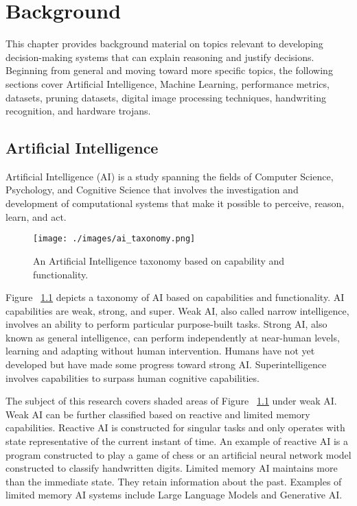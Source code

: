 \chapter{Background} \label{ch:background}

This chapter provides background material on topics relevant to developing
decision-making systems that can explain reasoning and justify decisions.
Beginning from general and moving toward more specific topics, the following
sections cover Artificial Intelligence, Machine Learning, performance metrics,
datasets, pruning datasets, digital image processing techniques, handwriting
recognition, and hardware trojans.

\section{Artificial Intelligence}\label{sec:ai}

Artificial Intelligence (AI) is a study spanning the fields of Computer Science,
Psychology, and Cognitive Science that involves the investigation and
development of computational systems that make it possible to perceive, reason,
learn, and act\cite{winston1992artificial, simon1995artificial,
russell2016artificial, tzimas2021legal}.

\begin{figure}[h]
    \centering
    \texttt{[image: ./images/ai\_taxonomy.png]}
    \caption{An Artificial Intelligence taxonomy based on capability and functionality.}
    \label{fig:ai_taxonomy}
\end{figure}

Figure ~\ref{fig:ai_taxonomy} depicts a taxonomy of AI based on capabilities and
functionality. AI capabilities are weak, strong, and super. Weak AI, also called
narrow intelligence, involves an ability to perform particular purpose-built
tasks. Strong AI, also known as general intelligence, can perform independently
at near-human levels, learning and adapting without human intervention. Humans
have not yet developed but have made some progress toward strong AI.
Superintelligence involves capabilities to surpass human cognitive
capabilities\cite{tzimas2021legal, samoili2020ai, Breen2024}.

The subject of this research covers shaded areas of Figure
~\ref{fig:ai_taxonomy} under weak AI. Weak AI can be further classified based on
reactive and limited memory capabilities. Reactive AI is constructed for
singular tasks and only operates with state representative of the current
instant of time. An example of reactive AI is a program constructed to play a
game of chess or an artificial neural network model constructed to classify
handwritten digits. Limited memory AI maintains more than the immediate state.
They retain information about the past. Examples of limited memory AI systems
include Large Language Models and Generative AI\cite{schossau2023towards}.

